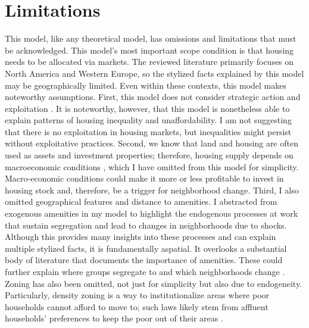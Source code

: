 \section{Limitations}

This model, like any theoretical model, has omissions and limitations that must be acknowledged. This model's most important scope condition is that housing needs to be allocated via markets. The reviewed literature primarily focuses on North America and Western Europe, so the stylized facts explained by this model may be geographically limited. Even within these contexts, this model makes noteworthy assumptions. First, this model does not consider strategic action and exploitation \citep{desmondPoorPayMore2019}. It is noteworthy, however, that this model is nonetheless able to explain patterns of housing inequality and unaffordability. I am not suggesting that there is no exploitation in housing markets, but inequalities might persist without exploitative practices. Second, we know that land and housing are often used as assets and investment properties; therefore, housing supply depends on macroeconomic conditions \citep{bayerSpeculativeFeverInvestor2021}, which I have omitted from this model for simplicity. Macro-economic conditions could make it more or less profitable to invest in housing stock and, therefore, be a trigger for neighborhood change. Third, I also omitted geographical features and distance to amenities. I abstracted from exogenous amenities in my model to highlight the endogenous processes at work that sustain segregation and lead to changes in neighborhoods due to shocks. Although this provides many insights into these processes and can explain multiple stylized facts, it is fundamentally aspatial. It overlooks a substantial body of literature that documents the importance of amenities. These could further explain where groups segregate to \citep{gaigneWhoLivesWhere2022} and which neighborhoods change \citep{leeNaturalAmenitiesNeighbourhood2018}. Zoning has also been omitted, not just for simplicity but also due to endogeneity. Particularly, density zoning is a way to institutionalize areas where poor households cannot afford to move to; such laws likely stem from affluent households' preferences to keep the poor out of their areas \citep{rothwellDensityZoningClass2010}.

